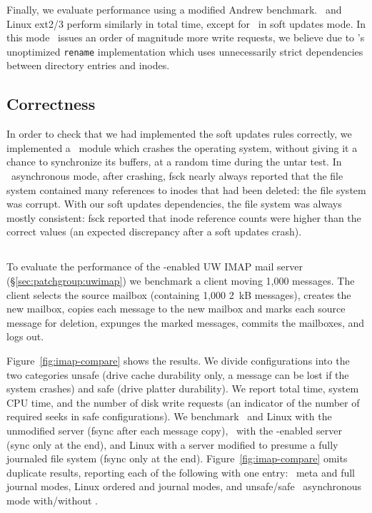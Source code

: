 Finally, we evaluate performance using a modified Andrew benchmark.
\Kudos\ and Linux ext2/3 perform similarly in total time,
%
except for \Kudos\ in soft updates mode. In this mode \Kudos\ issues
an order of magnitude more write requests, we believe due to \Kudos's
unoptimized \texttt{rename} implementation which uses unnecessarily
strict dependencies between directory entries and inodes.

\subsection {Correctness}
\label{sec:eval:correctness}

In order to check that we had implemented the soft updates rules correctly, we
implemented a \Kudos\ module which crashes the operating system, without
giving it a chance to synchronize its buffers, at a random time during the
untar test.
%
In \Kudos\ asynchronous mode, after crashing, fsck nearly always reported that
the file system contained many references to inodes that had been deleted: the
file system was corrupt.
%
With our soft updates dependencies, the file system was always mostly
consistent: fsck reported that inode reference counts were higher than the
correct values (an expected discrepancy after a soft updates crash).

\subsection {\Patchgroups}
\label{sec:evaluation:uwimap}


To evaluate the performance of the \patchgroup-enabled UW IMAP mail
server (\S\ref{sec:patchgroup:uwimap}) we benchmark a client moving
1,000 messages. The client selects the source mailbox (containing
1,000 2~kB messages), creates the new mailbox, copies each message to
the new mailbox and marks each source message for deletion, expunges
the marked messages, commits the mailboxes, and logs out.

Figure~\ref{fig:imap-compare} shows the results.
%
We divide configurations into the two categories unsafe (drive cache
durability only, a message can be lost if the system crashes) and safe
(drive platter durability).
%
We report total time, system CPU time, and the number of disk write
requests (an indicator of the number of required seeks in safe
configurations).
%
We benchmark
%
\Kudos\ and Linux with the unmodified server (fsync after each message
copy),
%
\Kudos\ with the \patchgroup-enabled server (sync only at the end),
%
and Linux with a server modified to presume a fully journaled file
system (fsync only at the end).
%
Figure~\ref{fig:imap-compare} omits duplicate results, reporting
each of the following with one entry:
%
\Kudos\ meta and full journal modes,
%
Linux ordered and journal modes,
%
and unsafe/safe \Kudos\ asynchronous mode with/without \patchgroups.

